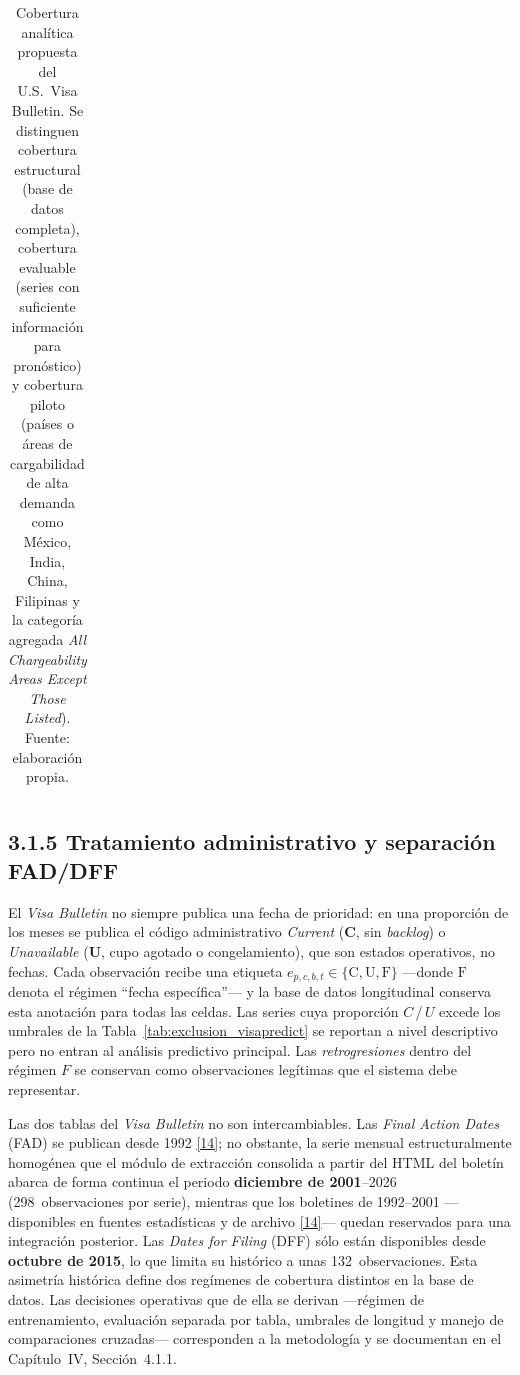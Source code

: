 \documentclass[12pt,letterpaper]{report}
\newcommand{\cita}[1]{\hyperref[bib:#1]{[#1]}}
\begin{document}
\begin{table}[H]
\begin{tabular}{>{\raggedright\arraybackslash}p{3.2cm}
                    >{\raggedright\arraybackslash}p{4.4cm}
                    >{\raggedright\arraybackslash}p{5.0cm}}
        \hline
    \end{tabular}
    \caption[Cobertura analítica propuesta del U.S. Visa Bulletin.]{Cobertura analítica propuesta del U.S.\ Visa Bulletin. Se distinguen cobertura estructural (base de datos completa), cobertura evaluable (series con suficiente información para pronóstico) y cobertura piloto (países o áreas de cargabilidad de alta demanda como México, India, China, Filipinas y la categoría agregada \textit{All Chargeability Areas Except Those Listed}). Fuente: elaboración propia.}
    \label{tab:cobertura_visapredict}
\end{table}

\subsection*{3.1.5 Tratamiento administrativo y separación FAD/DFF}

El \textit{Visa Bulletin} no siempre publica una fecha de prioridad: en una proporción de los meses se publica el código administrativo \textit{Current} (\textbf{C}, sin \textit{backlog}) o \textit{Unavailable} (\textbf{U}, cupo agotado o congelamiento), que son estados operativos, no fechas. Cada observación recibe una etiqueta $e_{p,c,b,t} \in \{\text{C}, \text{U}, \text{F}\}$ ---donde $\text{F}$ denota el régimen ``fecha específica''--- y la base de datos longitudinal conserva esta anotación para todas las celdas. Las series cuya proporción $C$\,/\,$U$ excede los umbrales de la Tabla~\ref{tab:exclusion_visapredict} se reportan a nivel descriptivo pero no entran al análisis predictivo principal. Las \textit{retrogresiones} dentro del régimen $F$ se conservan como observaciones legítimas que el sistema debe representar.

Las dos tablas del \textit{Visa Bulletin} no son intercambiables. Las \textit{Final Action Dates} (FAD) se publican desde 1992 \cita{14}; no obstante, la serie mensual estructuralmente homogénea que el módulo de extracción consolida a partir del HTML del boletín abarca de forma continua el periodo \textbf{diciembre de 2001}--2026 (298~observaciones por serie), mientras que los boletines de 1992--2001 ---disponibles en fuentes estadísticas y de archivo \cita{14}--- quedan reservados para una integración posterior. Las \textit{Dates for Filing} (DFF) sólo están disponibles desde \textbf{octubre de 2015}, lo que limita su histórico a unas 132~observaciones. Esta asimetría histórica define dos regímenes de cobertura distintos en la base de datos. Las decisiones operativas que de ella se derivan ---régimen de entrenamiento, evaluación separada por tabla, umbrales de longitud y manejo de comparaciones cruzadas--- corresponden a la metodología y se documentan en el Capítulo~IV, Sección~4.1.1.
\end{document}
